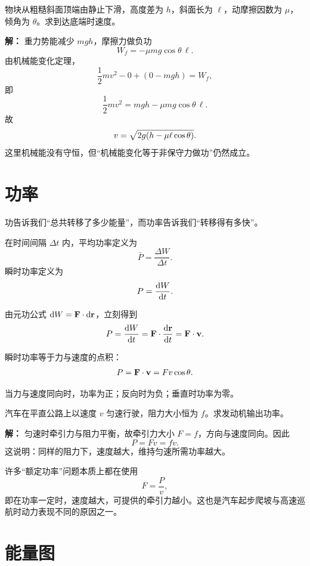 \begin{example}[含摩擦时机械能不守恒]
物块从粗糙斜面顶端由静止下滑，高度差为 $h$，斜面长为 $\ell$，动摩擦因数为 $\mu$，倾角为 $\theta$。求到达底端时速度。

\textbf{解：}
重力势能减少 $mgh$，摩擦力做负功
\[
W_f=-\mu mg\cos\theta\,\ell.
\]
由机械能变化定理，
\[
\frac{1}{2}mv^2 - 0 + (0-mgh)=W_f,
\]
即
\[
\frac{1}{2}mv^2 = mgh-\mu mg\cos\theta\,\ell.
\]
故
\[
v=\sqrt{2g\qty(h-\mu \ell\cos\theta)}.
\]
这里机械能没有守恒，但“机械能变化等于非保守力做功”仍然成立。
\end{example}

\section{功率}\label{sec:power}

功告诉我们“总共转移了多少能量”，而功率告诉我们“转移得有多快”。

\begin{definition}[平均功率与瞬时功率]
在时间间隔 $\Delta t$ 内，平均功率定义为
\[
\bar{P}=\frac{\Delta W}{\Delta t}.
\]
瞬时功率定义为
\[
P=\dv{W}{t}.
\]
\end{definition}

由元功公式 $\dd W=\vb{F}\cdot\dd\vb{r}$，立刻得到
\[
P=\dv{W}{t}=\vb{F}\cdot\dv{\vb{r}}{t}=\vb{F}\cdot\vb{v}.
\]

\begin{law}[功率公式]
瞬时功率等于力与速度的点积：
\[
P=\vb{F}\cdot \vb{v}=Fv\cos\theta.
\]
\end{law}

当力与速度同向时，功率为正；反向时为负；垂直时功率为零。

\begin{example}[汽车牵引功率]
汽车在平直公路上以速度 $v$ 匀速行驶，阻力大小恒为 $f$。求发动机输出功率。

\textbf{解：}
匀速时牵引力与阻力平衡，故牵引力大小 $F=f$，方向与速度同向。因此
\[
P=Fv=fv.
\]
这说明：同样的阻力下，速度越大，维持匀速所需功率越大。
\end{example}

\begin{remark}
许多“额定功率”问题本质上都在使用
\[
F=\frac{P}{v},
\]
即在功率一定时，速度越大，可提供的牵引力越小。这也是汽车起步爬坡与高速巡航时动力表现不同的原因之一。
\end{remark}

\section{能量图}\label{sec:energy-diagram}

